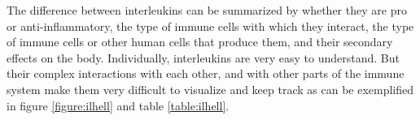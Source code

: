 The difference between interleukins can be summarized by whether they are pro or anti-inflammatory, the type of immune cells with which they interact, the type of immune cells or other human cells that produce them, and their secondary effects on the body. Individually, interleukins are very easy to understand. But their complex interactions with each other, and with other parts of the immune system make them very difficult to visualize and keep track as can be exemplified in figure \ref{figure:ilhell} and table \ref{table:ilhell}.


\begin{table}%
    \caption{Overview of all interleukins explained in this document}
    \label{table:ilhell}
    \renewcommand{\arraystretch}{1.7}
\end{table}
